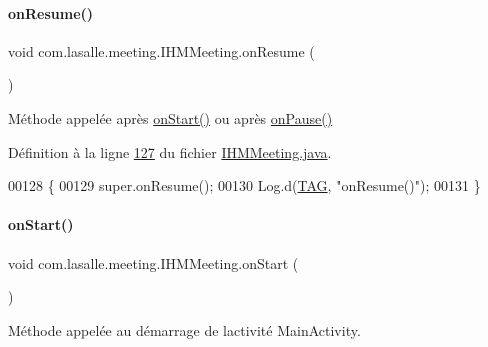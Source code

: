 \paragraph{\texorpdfstring{on\+Resume()}{onResume()}}
{\footnotesize\ttfamily void com.\+lasalle.\+meeting.\+I\+H\+M\+Meeting.\+on\+Resume (\begin{DoxyParamCaption}{ }\end{DoxyParamCaption})\hspace{0.3cm}{\ttfamily [protected]}}



Méthode appelée après \hyperlink{classcom_1_1lasalle_1_1meeting_1_1_i_h_m_meeting_a55bd9ed1bd85ada8c53930fb1650a954}{on\+Start()} ou après \hyperlink{classcom_1_1lasalle_1_1meeting_1_1_i_h_m_meeting_a1663a4b9bcff059ab95a72ca019cffb1}{on\+Pause()} 



Définition à la ligne \hyperlink{_i_h_m_meeting_8java_source_l00127}{127} du fichier \hyperlink{_i_h_m_meeting_8java_source}{I\+H\+M\+Meeting.\+java}.


\begin{DoxyCode}
00128     \{
00129         super.onResume();
00130         Log.d(\hyperlink{classcom_1_1lasalle_1_1meeting_1_1_i_h_m_meeting_a239eafcb0ccc896bdba538d1c0f08e65}{TAG}, \textcolor{stringliteral}{"onResume()"});
00131     \}
\end{DoxyCode}
\mbox{\label{classcom_1_1lasalle_1_1meeting_1_1_i_h_m_meeting_a55bd9ed1bd85ada8c53930fb1650a954}} 
\paragraph{\texorpdfstring{on\+Start()}{onStart()}}
{\footnotesize\ttfamily void com.\+lasalle.\+meeting.\+I\+H\+M\+Meeting.\+on\+Start (\begin{DoxyParamCaption}{ }\end{DoxyParamCaption})\hspace{0.3cm}{\ttfamily [protected]}}



Méthode appelée au démarrage de l\textquotesingle{}activité Main\+Activity. 

